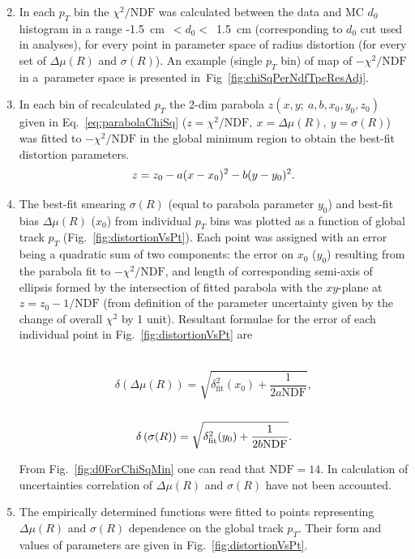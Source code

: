   \begin{enumerate}\setcounter{enumi}{1}
   \item In each $p_{T}$ bin the $\chi^{2}/\text{NDF}$ was calculated between the data and MC $d_{0}$ histogram in a range -1.5~cm~$<d_{0}<$~1.5~cm (corresponding to $d_{0}$ cut used in analyses), for every point in parameter space of radius distortion (for every set of $\Delta\mu(R)$ and $\sigma(R)$). An example (single $p_{T}$ bin) of map of $-\chi^{2}/\text{NDF}$ in a~parameter space is presented in~Fig~\ref{fig:chiSqPerNdfTpcResAdj}.
   \item In each bin of recalculated $p_{T}$ the 2-dim parabola $z\left(x,y;~a,b,x_{0},y_{0},z_{0}\right)$ given in Eq.~\eqref{eq:parabolaChiSq} ($z=\chi^{2}/\text{NDF},~x=\Delta\mu(R),~y=\sigma(R)$) was fitted to $-\chi^{2}/\text{NDF}$ in the global minimum region to obtain the best-fit distortion parameters.\vspace{-5pt}
   \begin{equation}\label{eq:parabolaChiSq}  z=z_{0}-a(x-x_{0})^{2}-b(y-y_{0})^{2}.\vspace{-5pt}\end{equation}
   \item The best-fit smearing $\sigma(R)$ (equal to parabola parameter $y_{0}$) and best-fit bias $\Delta\mu(R)$ ($x_{0}$) from individual $p_{T}$ bins was plotted as a function of global track $p_{T}$ (Fig.~\ref{fig:distortionVsPt}). Each point was assigned with an error being a quadratic sum of two components: the error on $x_{0}$ ($y_{0}$) resulting from the parabola fit to $-\chi^{2}/\text{NDF}$, and length of corresponding semi-axis of ellipsis formed by the intersection of fitted parabola with the $xy$-plane at $z=z_{0}-1/\text{NDF}$ (from definition of the parameter uncertainty given by the change of overall $\chi^{2}$ by 1 unit). Resultant formulae for the error of each individual point in Fig.~\ref{fig:distortionVsPt} are%
   \begin{multicols}{2}~\\[-30pt]
    \begin{equation}\label{eq:errorDeltaMuR}  \delta\left(\Delta\mu(R)\right)=\sqrt{\delta_{\text{fit}}^{2}(x_{0}) + \frac{1}{2a\text{NDF}}},\end{equation}
   \break\\[-60pt]
    \begin{equation}\label{eq:errorSigmaR} \delta\left(\sigma(R)\right)=\sqrt{\delta_{\text{fit}}^{2}(y_{0}) + \frac{1}{2b\text{NDF}}}.\vspace{-5pt}\end{equation}
    \end{multicols}\vspace*{-7pt}
    From Fig.~\ref{fig:d0ForChiSqMin} one can read that $\text{NDF}=14$. In calculation of uncertainties correlation of $\Delta\mu(R)$ and $\sigma(R)$ have not been accounted.
   \item The empirically determined functions were fitted to points representing $\Delta\mu(R)$ and $\sigma(R)$ dependence on the global track $p_{T}$. Their form and values of parameters are given in Fig.~\ref{fig:distortionVsPt}.
  \end{enumerate}%
  
